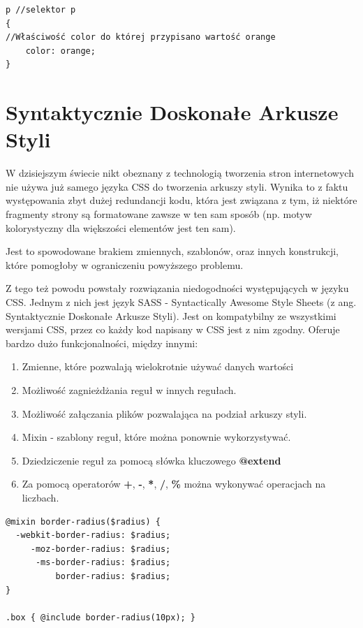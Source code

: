\begin{lstlisting}[frame=single, numbers=none,captionpos=b, 
caption={Przykład prostej reguły, dzięki której wszystkie paragrafy będą miały domyślnie kolor pomarańczowy.}]
p //selektor p
{
//Właściwość color do której przypisano wartość orange
    color: orange;
}
\end{lstlisting}

\section{Syntaktycznie Doskonałe Arkusze Styli}

W dzisiejszym świecie nikt obeznany z technologią tworzenia stron internetowych nie używa już samego języka CSS do tworzenia arkuszy styli. 
Wynika to z faktu występowania zbyt dużej redundancji kodu, która jest związana z tym, iż niektóre fragmenty strony są formatowane zawsze w ten sam sposób (np. motyw kolorystyczny dla większości elementów jest ten sam). 

Jest to spowodowane brakiem zmiennych, szablonów, oraz innych konstrukcji, które pomogłoby w ograniczeniu powyższego problemu. 

Z tego też powodu powstały rozwiązania niedogodności występujących w języku CSS. Jednym z nich jest język SASS - Syntactically Awesome Style Sheets (z ang. Syntaktycznie Doskonałe Arkusze Styli)\cite{Sass}. Jest on kompatybilny ze wszystkimi wersjami CSS, przez co każdy kod napisany w CSS jest z nim zgodny. Oferuje bardzo dużo funkcjonalności, między innymi:
\begin{enumerate}
	\item Zmienne, które pozwalają wielokrotnie używać danych wartości
	\item Możliwość zagnieżdżania reguł w innych regułach.
	\item Możliwość załączania plików pozwalająca na podział arkuszy styli.
	\item Mixin - szablony reguł, które można ponownie wykorzystywać.
	\item Dziedziczenie reguł za pomocą słówka kluczowego \textbf{@extend}
	\item Za pomocą operatorów \textbf{+}, \textbf{-}, \textbf{*}, \textbf{/}, \textbf{\%} można wykonywać operacjach na liczbach.
\end{enumerate}


\begin{lstlisting}[frame=single, numbers=none,captionpos=b, 
caption={Przykładowy kod SASS wykorzystujący mixin.}]
@mixin border-radius($radius) {
  -webkit-border-radius: $radius;
     -moz-border-radius: $radius;
      -ms-border-radius: $radius;
          border-radius: $radius;
}

.box { @include border-radius(10px); }
\end{lstlisting}

